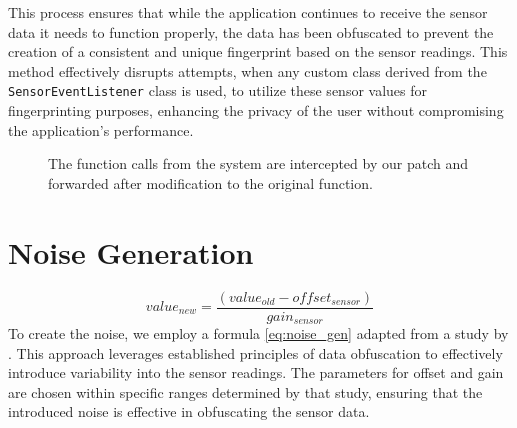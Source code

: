 \documentclass[11pt,
  oneside,openany,    %
]{scrreprt}
\begin{document}
This process ensures that while the application continues to receive the sensor data it needs to function properly, the data has been obfuscated to prevent the creation of a consistent and unique fingerprint based on the sensor readings.
This method effectively disrupts attempts, when any custom class derived from the \verb|SensorEventListener| class is used, to utilize these sensor values for fingerprinting purposes, enhancing the privacy of the user without compromising the application's performance.

\begin{figure}[h]
  \centering
  \captionsetup{justification=centering}
  \caption{The function calls from the system are intercepted by our patch and forwarded after modification to the original function.}
  \label{fig:patch}
\end{figure}

\section{Noise Generation}
\label{sec:noise_gen}
\begin{equation}
  value_{new} = \frac{(value_{old} - offset_{sensor})}{gain_{sensor}}
  \label{eq:noise_gen}
\end{equation}
To create the noise, we employ a formula \ref{eq:noise_gen} adapted from a study by \citeauthor{DBLP:conf/ndss/DasBC16} \cite{DBLP:conf/ndss/DasBC16}.
This approach leverages established principles of data obfuscation to effectively introduce variability into the sensor readings.
The parameters for offset and gain are chosen within specific ranges determined by that study, ensuring that the introduced noise is effective in obfuscating the sensor data.
\end{document}
